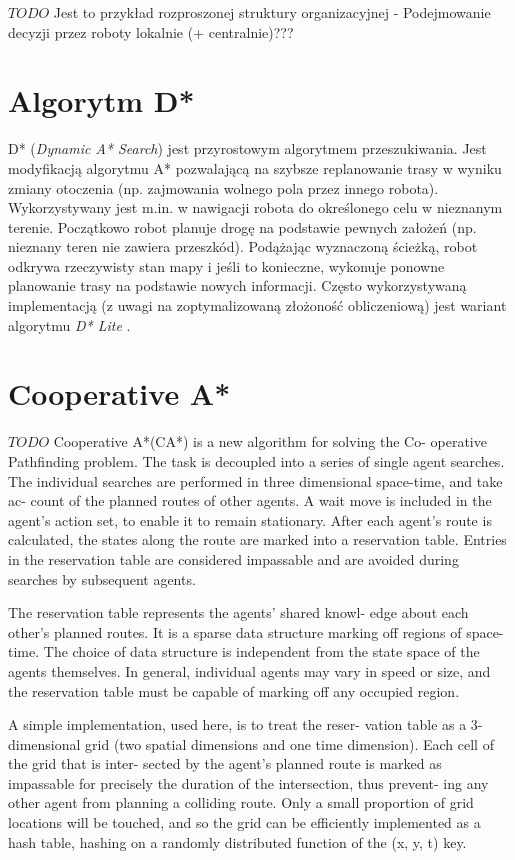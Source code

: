 $TODO$ Jest to przykład rozproszonej struktury organizacyjnej - Podejmowanie decyzji przez roboty lokalnie (+ centralnie)???

\section{Algorytm D*}
D* ({\it Dynamic A* Search}) jest przyrostowym algorytmem przeszukiwania. Jest modyfikacją algorytmu A* pozwalającą na szybsze replanowanie trasy w wyniku zmiany otoczenia (np. zajmowania wolnego pola przez innego robota). Wykorzystywany jest m.in. w nawigacji robota do określonego celu w nieznanym terenie. Początkowo robot planuje drogę na podstawie pewnych założeń (np. nieznany teren nie zawiera przeszkód). Podążając wyznaczoną ścieżką, robot odkrywa rzeczywisty stan mapy i jeśli to konieczne, wykonuje ponowne planowanie trasy na podstawie nowych informacji.
Często wykorzystywaną implementacją (z uwagi na zoptymalizowaną złożoność obliczeniową) jest wariant algorytmu {\it D* Lite} \cite{dstarlite}.

\section{Cooperative A*}
$TODO$
Cooperative A*(CA*) is a new algorithm for solving the Co-
operative Pathfinding problem. The task is decoupled into
a series of single agent searches. The individual searches
are performed in three dimensional space-time, and take ac-
count of the planned routes of other agents. A wait move
is included in the agent’s action set, to enable it to remain
stationary. After each agent’s route is calculated, the states
along the route are marked into a reservation table. Entries
in the reservation table are considered impassable and are
avoided during searches by subsequent agents.

The reservation table represents the agents’ shared knowl-
edge about each other’s planned routes. It is a sparse data
structure marking off regions of space-time. The choice
of data structure is independent from the state space of the
agents themselves. In general, individual agents may vary in
speed or size, and the reservation table must be capable of
marking off any occupied region.

A simple implementation, used here, is to treat the reser-
vation table as a 3-dimensional grid (two spatial dimensions
and one time dimension). Each cell of the grid that is inter-
sected by the agent’s planned route is marked as impassable
for precisely the duration of the intersection, thus prevent-
ing any other agent from planning a colliding route. Only a
small proportion of grid locations will be touched, and so the
grid can be efficiently implemented as a hash table, hashing
on a randomly distributed function of the (x, y, t) key.

